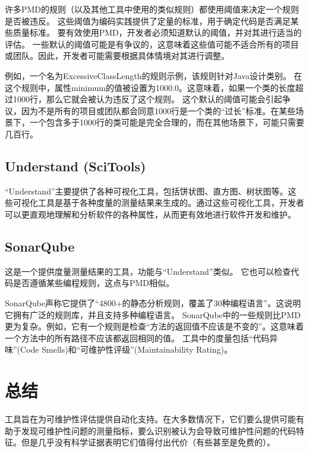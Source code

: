 许多PMD的规则（以及其他工具中使用的类似规则）都使用阈值来决定一个规则是否被违反。
这些阈值为编码实践提供了定量的标准，用于确定代码是否满足某些质量标准。
要有效使用PMD，开发者必须知道默认的阈值，并对其进行适当的评估。
一些默认的阈值可能是有争议的，这意味着这些值可能不适合所有的项目或团队。因此，开发者可能需要根据具体情境对其进行调整。

例如，一个名为ExcessiveClassLength的规则示例，该规则针对Java设计类别。
在这个规则中，属性minimum的值被设置为1000.0。这意味着，如果一个类的长度超过1000行，那么它就会被认为违反了这个规则。
这个默认的阈值可能会引起争议，因为不是所有的项目或团队都会同意1000行是一个类的“过长”标准。在某些场景下，一个包含多于1000行的类可能是完全合理的，而在其他场景下，可能只需要几百行。

\subsection{Understand (SciTools)}

``Understand”主要提供了各种可视化工具，包括饼状图、直方图、树状图等。这些可视化工具是基于各种度量的测量结果来生成的。通过这些可视化工具，开发者可以更直观地理解和分析软件的各种属性，从而更有效地进行软件开发和维护。

\subsection{SonarQube}

这是一个提供度量测量结果的工具，功能与“Understand”类似。
它也可以检查代码是否遵循某些编程规则，这点与PMD相似。

SonarQube声称它提供了``4800+的静态分析规则，覆盖了30种编程语言”。这说明它拥有广泛的规则库，并且支持多种编程语言。
SonarQube中的一些规则比PMD更为复杂。例如，它有一个规则是检查``方法的返回值不应该是不变的”。这意味着一个方法中的所有路径不应该都返回相同的值。
工具中的度量包括``代码异味”(Code Smells)和“可维护性评级”(Maintainability Rating)。

\section{总结}

工具旨在为可维护性评估提供自动化支持。在大多数情况下，它们要么提供可能有助于发现可维护性问题的测量指标，要么识别被认为会导致可维护性问题的代码特征。但是几乎没有科学证据表明它们值得付出代价（有些甚至是免费的）。
































